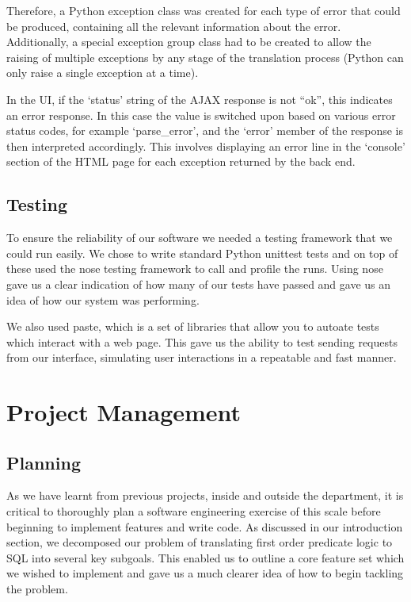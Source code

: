 \documentclass[a4paper, 11pt]{article}
\begin{document}
      Therefore, a Python exception class was created for each type of error
      that could be produced, containing all the relevant information about the
      error. Additionally, a special exception group class had to be created to
      allow the raising of multiple exceptions by any stage of the translation
      process (Python can only raise a single exception at a time).

      In the UI, if the `status' string of the AJAX response is not ``ok'', this
      indicates an error response. In this case the value is switched upon based
      on various error status codes, for example `parse\_error', and the `error'
      member of the response is then interpreted accordingly. This involves
      displaying an error line in the `console' section of the HTML page for
      each exception returned by the back end.

  \subsection{Testing}
    To ensure the reliability of our software we needed a testing framework that
    we could run easily. We chose to write standard Python unittest tests and on
    top of these used the nose testing framework to call and profile the runs.
    Using nose gave us a clear indication of how many of our tests have passed
    and gave us an idea of how our system was performing.

    We also used paste, which is a set of libraries that allow you to autoate
    tests which interact with a web page. This gave us the ability to test
    sending requests from our interface, simulating user interactions in a
    repeatable and fast manner.

\section{Project Management}

  \subsection{Planning}

    As we have learnt from previous projects, inside and outside the
    department, it is critical to thoroughly plan a software engineering
    exercise of this scale before beginning to implement features and write
    code. As discussed in our introduction section, we decomposed our problem
    of translating first order predicate logic to SQL into several key
    subgoals. This enabled us to outline a core feature set which we wished to
    implement and gave us a much clearer idea of how to begin tackling the
    problem.
\end{document}
